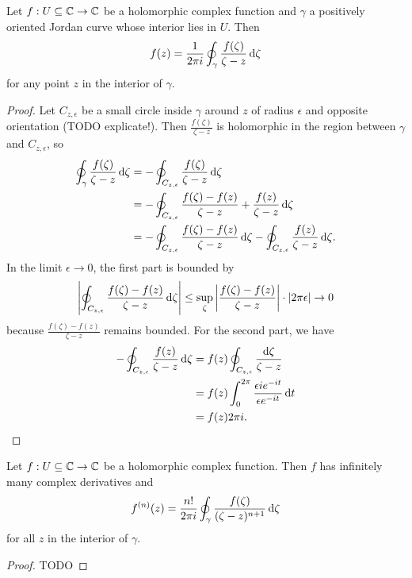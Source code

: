 \begin{theorem} \label{CauchyIntergralFormula}
Let $f: U\subseteq \mathbb{C} \to \mathbb{C}$ be a holomorphic complex function and $\gamma$ a positively oriented Jordan curve whose interior lies in $U$. Then
\[ f(z) = \frac{1}{2\pi i}\oint_\gamma \frac{f(\zeta)}{\zeta - z}\operatorname{d \!}{\zeta} \]
for any point $z$ in the interior of $\gamma$.
\end{theorem}
\begin{proof}
Let $C_{z,\epsilon}$ be a small circle inside $\gamma$ around $z$ of radius $\epsilon$ and opposite orientation (TODO explicate!). Then $\frac{f(\zeta)}{\zeta - z}$ is holomorphic in the region between $\gamma$ and $C_{z,\epsilon}$, so
\begin{align*}
\oint_\gamma \frac{f(\zeta)}{\zeta - z}\operatorname{d \!}{\zeta} &= -\oint_{C_{z,\epsilon}} \frac{f(\zeta)}{\zeta - z}\operatorname{d \!}{\zeta} \\
&= -\oint_{C_{z,\epsilon}} \frac{f(\zeta)-f(z)}{\zeta - z} + \frac{f(z)}{\zeta - z}\operatorname{d \!}{\zeta} \\
&= -\oint_{C_{z,\epsilon}} \frac{f(\zeta)-f(z)}{\zeta - z}\operatorname{d \!}{\zeta} -\oint_{C_{z,\epsilon}}\frac{f(z)}{\zeta - z}\operatorname{d \!}{\zeta}.
\end{align*}
In the limit $\epsilon \to 0$, the first part is bounded by
\[ \left|\oint_{C_{z,\epsilon}} \frac{f(\zeta)-f(z)}{\zeta - z}\operatorname{d \!}{\zeta}\right| \leq \sup_\zeta\left|\frac{f(\zeta)-f(z)}{\zeta - z}\right| \cdot |2\pi\epsilon| \to 0 \]
because $\frac{f(\zeta)-f(z)}{\zeta - z}$ remains bounded. For the second part, we have
\begin{align*}
-\oint_{C_{z,\epsilon}} \frac{f(z)}{\zeta - z}\operatorname{d \!}{\zeta} &= f(z)\oint_{C_{z,\epsilon}} \frac{\operatorname{d \!}{\zeta}}{\zeta - z} \\
&= f(z)\int_0^{2\pi}\frac{\epsilon ie^{-it}}{\epsilon e^{-it}}\operatorname{d \!}{t} \\
&= f(z)2\pi i.
\end{align*}
\end{proof}
\begin{corollary}
Let $f: U\subseteq \mathbb{C} \to \mathbb{C}$ be a holomorphic complex function. Then $f$ has infinitely many complex derivatives and
\[ f^{(n)}(z) = \frac{n!}{2\pi i}\oint_\gamma \frac{f(\zeta)}{(\zeta-z)^{n+1}}\operatorname{d \!}{\zeta} \]
for all $z$ in the interior of $\gamma$.
\end{corollary}
\begin{proof}
TODO
\end{proof}

